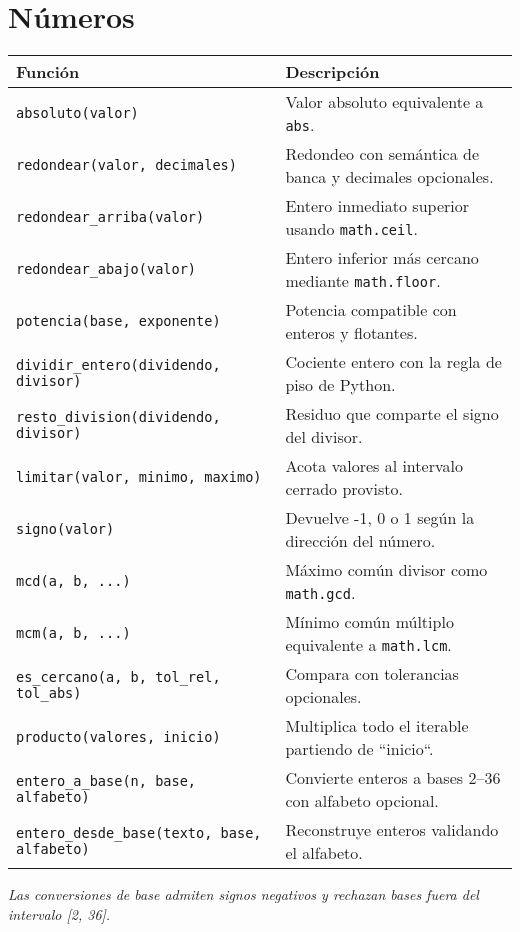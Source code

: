 \documentclass{article}
\begin{document}
\section*{Números}
\begin{tabular}{ll}
\textbf{Función} & \textbf{Descripción}\\\hline
\texttt{absoluto(valor)} & Valor absoluto equivalente a \texttt{abs}.\\
\texttt{redondear(valor, decimales)} & Redondeo con semántica de banca y decimales opcionales.\\
\texttt{redondear\_arriba(valor)} & Entero inmediato superior usando \texttt{math.ceil}.\\
\texttt{redondear\_abajo(valor)} & Entero inferior más cercano mediante \texttt{math.floor}.\\
\texttt{potencia(base, exponente)} & Potencia compatible con enteros y flotantes.\\
\texttt{dividir\_entero(dividendo, divisor)} & Cociente entero con la regla de piso de Python.\\
\texttt{resto\_division(dividendo, divisor)} & Residuo que comparte el signo del divisor.\\
\texttt{limitar(valor, minimo, maximo)} & Acota valores al intervalo cerrado provisto.\\
\texttt{signo(valor)} & Devuelve -1, 0 o 1 según la dirección del número.\\
\texttt{mcd(a, b, ...)} & Máximo común divisor como \texttt{math.gcd}.\\
\texttt{mcm(a, b, ...)} & Mínimo común múltiplo equivalente a \texttt{math.lcm}.\\
\texttt{es\_cercano(a, b, tol\_rel, tol\_abs)} & Compara con tolerancias opcionales.\\
\texttt{producto(valores, inicio)} & Multiplica todo el iterable partiendo de ``inicio``.\\
\texttt{entero\_a\_base(n, base, alfabeto)} & Convierte enteros a bases 2--36 con alfabeto opcional.\\
\texttt{entero\_desde\_base(texto, base, alfabeto)} & Reconstruye enteros validando el alfabeto.\\
\end{tabular}

\textit{Las conversiones de base admiten signos negativos y rechazan bases fuera del intervalo [2, 36].}
\end{document}
